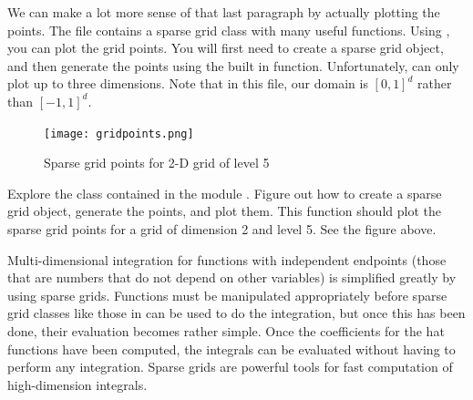 We can make a lot more sense of that last paragraph by actually plotting the points.  The file  contains a sparse grid class with many useful functions.  Using , you can plot the grid points.  You will first need to create a sparse grid object, and then generate the points using the built in function.  Unfortunately,  can only plot up to three dimensions.  Note that in this file, our domain is $[0,1]^d$ rather than $[-1,1]^d$.  

\begin{center}
\begin{figure}
\texttt{[image: gridpoints.png]}
\caption{Sparse grid points for 2-D grid of level 5}
\label{fig:gridpoints}
\end{figure}
\end{center}



\begin{problem}
Explore the  class contained in the module . Figure out how to create a sparse grid object, generate the points, and plot them. This function should plot the sparse grid points for a grid of dimension 2 and level 5. See the figure above.
\end{problem}



Multi-dimensional integration for functions with independent endpoints (those that are numbers that do not depend on other variables) is simplified greatly by using sparse grids.  Functions must be manipulated appropriately before sparse grid classes like those in  can be used to do the integration, but once this has been done, their evaluation becomes rather simple.  Once the coefficients for the hat functions have been computed, the integrals can be evaluated without having to perform any integration.  Sparse grids are powerful tools for fast computation of high-dimension integrals.  

